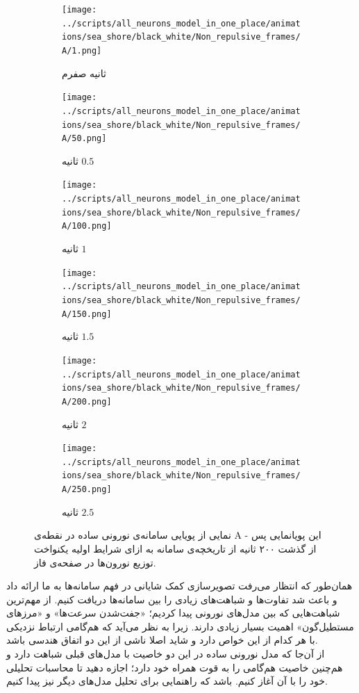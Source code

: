 \newpage
\begin{figure}
	\begin{subfigure}{0.5\textwidth}
		\texttt{[image: ../scripts/all\_neurons\_model\_in\_one\_place/animations/sea\_shore/black\_white/Non\_repulsive\_frames/A/1.png]}
		\caption{
			ثانیه صفرم		
		}
	\end{subfigure}
	\hfill
	\begin{subfigure}{0.5\textwidth}
		\texttt{[image: ../scripts/all\_neurons\_model\_in\_one\_place/animations/sea\_shore/black\_white/Non\_repulsive\_frames/A/50.png]}
		\caption{
			ثانیه $0.5$
		}
	\end{subfigure}
	\hfill
	\begin{subfigure}{0.5\textwidth}
		\texttt{[image: ../scripts/all\_neurons\_model\_in\_one\_place/animations/sea\_shore/black\_white/Non\_repulsive\_frames/A/100.png]}
		\caption{
			ثانیه $1$		
		}
	\end{subfigure}
	\hfill
	\begin{subfigure}{0.5\textwidth}
		\texttt{[image: ../scripts/all\_neurons\_model\_in\_one\_place/animations/sea\_shore/black\_white/Non\_repulsive\_frames/A/150.png]}
		\caption{
			ثانیه $1.5$
		}
	\end{subfigure}
	\hfill
	\begin{subfigure}{0.5\textwidth}
		\texttt{[image: ../scripts/all\_neurons\_model\_in\_one\_place/animations/sea\_shore/black\_white/Non\_repulsive\_frames/A/200.png]}
		\caption{
			ثانیه $2$
		}
	\end{subfigure}
	\hfill
	\begin{subfigure}{0.5\textwidth}
		\texttt{[image: ../scripts/all\_neurons\_model\_in\_one\_place/animations/sea\_shore/black\_white/Non\_repulsive\_frames/A/250.png]}
		\caption{
			ثانیه $2.5$
		}
	\end{subfigure}
	\hfill
	\caption{
		نمایی از پویایی سامانه‌ی نورونی ساده در نقطه‌ی A - این پویانمایی پس از گذشت ۲۰۰ ثانیه از تاریخچه‌ی سامانه به ازای شرایط اولیه یکنواخت توزیع نورون‌ها در صفحه‌ی فاز.	
	}
	\label{fig:simple_animation_A}
\end{figure}

همان‌طور که انتظار می‌رفت تصویرسازی کمک شایانی در فهم سامانه‌ها به ما ارائه داد و باعث شد تفاوت‌ها و شباهت‌های زیادی را بین سامانه‌ها دریافت کنیم. از مهم‌ترین شباهت‌هایی که بین مدل‌های نورونی پیدا کردیم؛ «جفت‌شدن سرعت‌ها» و «مرزهای مستطیل‌گون» اهمیت بسیار زیادی دارند. زیرا به نظر می‌آيد که هم‌گامی ارتباط نزدیکی با هر کدام از این خواص دارد و شاید اصلا ناشی از این دو اتفاق هندسی باشد.\\
از آن‌جا که مدل نورونی ساده در این دو خاصیت با مدل‌های قبلی شباهت دارد و هم‌چنین خاصیت هم‌گامی را به قوت همراه خود دارد؛ اجازه دهید تا محاسبات تحلیلی خود را با آن آغاز کنیم. باشد که راهنمایی برای تحلیل مدل‌های دیگر نیز پیدا کنیم.














